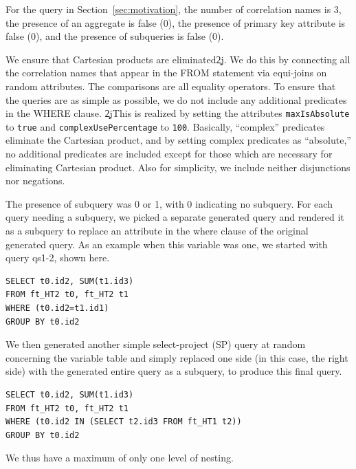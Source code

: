 \documentclass[prodmode,acmtods]{acmsmall}
\begin{document}
For the query in Section~\ref{sec:motivation}, the number of correlation
names is 3, the presence of an aggregate
is false (0), the presence of primary key attribute is false (0),
and the presence of subqueries is false (0).

{}We ensure that Cartesian products are
eliminated\c2j{.}{}  We do this by
connecting all the correlation names that appear in the FROM statement via
equi-joins on random attributes. The comparisons are all
equality operators. To ensure that the queries are as simple as possible, we
do not include any additional predicates in the WHERE clause.  \c2j{}{This
  is realized by setting the attributes {\tt maxIsAbsolute} to {\tt true}
  and {\tt complexUsePercentage} to {\tt 100}.  Basically, ``complex''
  predicates eliminate the Cartesian product, and by setting complex
  predicates as ``absolute,'' no additional predicates are included except
  for those which are necessary for eliminating Cartesian product.} Also
for simplicity, we include neither disjunctions nor negations.


The presence of subquery was 0 or 1, with 0 indicating no
subquery. For each query needing a subquery, we picked a separate generated query and
rendered it as a subquery to replace an attribute in the where clause of the
original generated query. As an example when this variable was one, we
started with query qs1-2, shown here.

\begin{verbatim}
SELECT t0.id2, SUM(t1.id3)
FROM ft_HT2 t0, ft_HT2 t1
WHERE (t0.id2=t1.id1)
GROUP BY t0.id2
\end{verbatim}

We then generated another simple select-project (SP) 
query at random concerning the variable table 
and simply replaced one side (in this case, the right side) with the generated entire 
query as a subquery, to produce this final query.

\begin{verbatim}
SELECT t0.id2, SUM(t1.id3)
FROM ft_HT2 t0, ft_HT2 t1
WHERE (t0.id2 IN (SELECT t2.id3 FROM ft_HT1 t2)) 
GROUP BY t0.id2
\end{verbatim}
We thus have a maximum of only one level of nesting.
\end{document}
